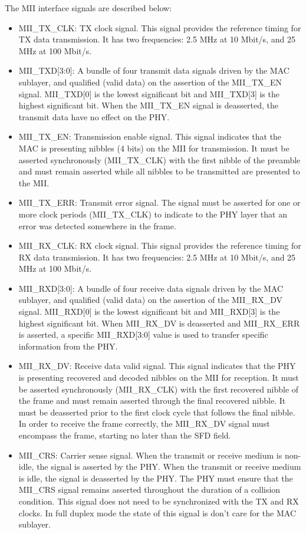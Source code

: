 \documentclass[main\_\_EN.tex]{subfiles}
\begin{document}
The MII interface signals are described below:
\begin{itemize}
    \item MII\_TX\_CLK: TX clock signal. This signal provides the reference timing for TX data transmission. It has two frequencies: 2.5 MHz at 10 Mbit/s, and 25 MHz at 100 Mbit/s.
    \item MII\_TXD[3:0]: A bundle of four transmit data signals driven by the MAC sublayer, and qualified (valid data) on the assertion of the MII\_TX\_EN signal. MII\_TXD[0] is the lowest significant bit and MII\_TXD[3] is the highest significant bit. When the MII\_TX\_EN signal is deasserted, the transmit data have no effect on the PHY.
    \item MII\_TX\_EN: Transmission enable signal. This signal indicates that the MAC is presenting nibbles (4 bits) on the MII for transmission. It must be asserted synchronously (MII\_TX\_CLK) with the first nibble of the preamble and must remain asserted while all nibbles to be transmitted are presented to the MII.
    \item MII\_TX\_ERR: Transmit error signal. The signal must be asserted for one or more clock periods (MII\_TX\_CLK) to indicate to the PHY layer that an error was detected somewhere in the frame.
    \item MII\_RX\_CLK: RX clock signal. This signal provides the reference timing for RX data transmission. It has two frequencies: 2.5 MHz at 10 Mbit/s, and 25 MHz at 100 Mbit/s.
    \item MII\_RXD[3:0]: A bundle of four receive data signals driven by the MAC sublayer, and qualified (valid data) on the assertion of the MII\_RX\_DV signal. MII\_RXD[0] is the lowest significant bit and MII\_RXD[3] is the highest significant bit. When MII\_RX\_DV is deasserted and MII\_RX\_ERR is asserted, a specific MII\_RXD[3:0] value is used to transfer specific information from the PHY.
    \item MII\_RX\_DV: Receive data valid signal. This signal indicates that the PHY is presenting recovered and decoded nibbles on the MII for reception. It must be asserted synchronously (MII\_RX\_CLK) with the first recovered nibble of the frame and must remain asserted through the final recovered nibble. It must be deasserted prior to the first clock cycle that follows the final nibble. In order to receive the frame correctly, the MII\_RX\_DV signal must encompass the frame, starting no later than the SFD field.
    \item MII\_CRS: Carrier sense signal. When the transmit or receive medium is non-idle, the signal is asserted by the PHY. When the transmit or receive medium is idle, the signal is deasserted by the PHY. The PHY must ensure that the MII\_CRS signal remains asserted throughout the duration of a collision condition. This signal does not need to be synchronized with the TX and RX clocks.  In full duplex mode the state of this signal is don't care for the MAC sublayer.

\end{itemize}
\end{document}
